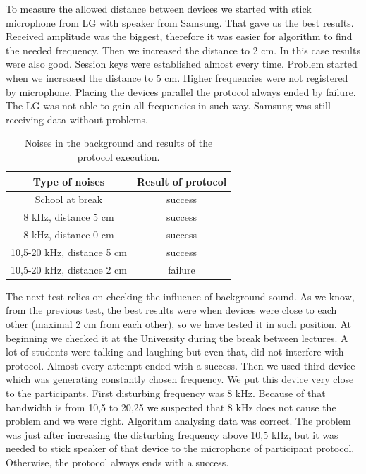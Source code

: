 \documentclass[11pt,titlepage]{article}
\theoremstyle{plain}
\begin{document}
To measure the allowed distance between devices we started with stick microphone from LG with speaker from Samsung. That gave us the best results. Received amplitude was the biggest, therefore it was easier for algorithm to find the needed frequency. Then we increased the distance to 2 cm. In this case results were also good. Session keys were established almost every time. Problem started when we increased the distance to 5 cm. Higher frequencies were not registered by microphone. Placing the devices parallel the protocol always ended by failure. The LG was not able to gain all frequencies in such way. Samsung was still receiving data without problems. 

\vspace{5mm}

	\begin{table}[H]
		\centering
		\begin{tabular}{| c | c |}
			\hline
			Type of noises & Result of protocol \\
			\hline
			School at break & success \\
			\hline
			8 kHz, distance 5 cm & success \\
			\hline
			8 kHz, distance 0 cm & success \\
			\hline
			10,5-20 kHz, distance 5 cm & success \\
			\hline
			10,5-20 kHz, distance 2 cm & failure \\
			\hline
		\end{tabular}
		\caption{Noises in the background and results of the protocol execution.}
	\end{table}

The next test relies on checking the influence of background sound. As we know, from the previous test, the best results were when devices were close to each other (maximal 2 cm from each other), so we have tested it in such position. At beginning we checked it at the University during the break between lectures. A lot of students were talking and laughing but even that, did not interfere with protocol. Almost every attempt ended with a success. Then we used third device which was generating constantly chosen frequency. We put this device very close to the participants. First disturbing frequency was 8 kHz. Because of that bandwidth is from 10,5 to 20,25 we suspected that 8 kHz does not cause the problem and we were right. Algorithm analysing data was correct. The problem was just after increasing the disturbing frequency above 10,5 kHz, but it was needed to stick speaker of that device to the microphone of participant protocol. Otherwise, the protocol always ends with a success. 
\end{document}

